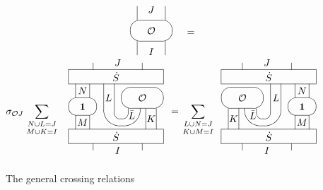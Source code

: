 \documentclass[a4paper,a4paper]{article}
\begin{document}
\begin{figure}[tbh]
\begin{gather*}
\begin{array}{l}
\unitlength .25mm\begin{picture}(60,70)(10,0) \put(30,35){\oval(60,30)[]}
\put(10,0){\line(0,1){20}} \put(50,0){\line(0,1){20}}
\put(10,50){\line(0,1){20}} \put(50,50){\line(0,1){20}}
\put(30,35){\makebox(0,0)[cc]{$\cal O$}} \put(30,5){\makebox(0,0)[cc]{$I$}}
\put(30,65){\makebox(0,0)[cc]{$J$}} \end{picture}
\end{array}
= \\
\sigma _{\mathcal{O}J}\sum_{\genfrac{}{}{0pt}1{N\cup L=J}{M\cup K=I}} 
\begin{array}{l}
\unitlength 0.25mm\begin{picture}(140,135) \put(110,85){\oval(60,30)[]}
\put(110,85){\makebox(0,0)[cc]{$\cal O$}} \put(81,70){\oval(52,50)[b]}
\put(80,70){\oval(20,30)[b]} \put(130,40){\line(0,1){30}}
\put(115,40){\line(0,1){30}} \put(70,70){\line(0,1){35}}
\put(55,70){\line(0,1){35}} \put(110,10){\line(0,1){10}}
\put(40,10){\line(0,1){10}} \put(110,125){\line(0,1){10}}
\put(40,125){\line(0,1){10}} \put(75,10){\makebox(0,0)[cc]{$I$}}
\put(75,135){\makebox(0,0)[cc]{$J$}} \put(122.50,55){\makebox(0,0)[cc]{$K$}}
\put(95,61){\makebox(0,0)[cc]{$\bar L$}} \put(62,85){\makebox(0,0)[cc]{$L$}}
\put(5,20){\framebox(135,20)[cc]{$\dot S$}}
\put(5,105){\framebox(135,20)[cc]{$\dot S$}} \put(25,72.50){\oval(40,25)[]}
\put(25,72.50){\makebox(0,0)[cc]{$\bf 1$}} \put(15,40){\line(0,1){20}}
\put(35,40){\line(0,1){20}} \put(35,85){\line(0,1){20}}
\put(15,85){\line(0,1){20}} \put(25,50){\makebox(0,0)[cc]{$M$}}
\put(25,95){\makebox(0,0)[cc]{$N$}} \end{picture}
\end{array}
=\sum_{\genfrac{}{}{0pt}1{L\cup N=J}{K\cup M=I}} 
\begin{array}{l}
\unitlength 0.25mm\begin{picture}(135,135) \put(30,85){\oval(60,30)[]}
\put(30,85){\makebox(0,0)[cc]{$\cal O$}} \put(59,70){\oval(52,50)[b]}
\put(60,70){\oval(20,30)[b]} \put(10,40){\line(0,1){30}}
\put(25,40){\line(0,1){30}} \put(70,70){\line(0,1){35}}
\put(85,70){\line(0,1){35}} \put(30,10){\line(0,1){10}}
\put(100,10){\line(0,1){10}} \put(30,125){\line(0,1){10}}
\put(100,125){\line(0,1){10}} \put(65,10){\makebox(0,0)[cc]{$I$}}
\put(65,135){\makebox(0,0)[cc]{$J$}} \put(17.50,55){\makebox(0,0)[cc]{$K$}}
\put(45,61){\makebox(0,0)[cc]{$\bar L$}} \put(78,85){\makebox(0,0)[cc]{$L$}}
\put(0,20){\framebox(135,20)[cc]{$\dot S$}}
\put(0,105){\framebox(135,20)[cc]{$\dot S$}} \put(115,72.50){\oval(40,25)[]}
\put(115,72.50){\makebox(0,0)[cc]{$\bf 1$}} \put(125,40){\line(0,1){20}}
\put(105,40){\line(0,1){20}} \put(105,85){\line(0,1){20}}
\put(125,85){\line(0,1){20}} \put(115,50){\makebox(0,0)[cc]{$M$}}
\put(115,95){\makebox(0,0)[cc]{$N$}} \end{picture}
\end{array}
\end{gather*}
\caption{The general crossing relations}
\label{fcr}
\end{figure}
\end{document}

